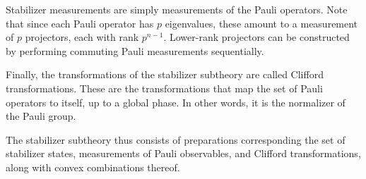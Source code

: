 \documentclass[%
 reprint,
superscriptaddress,
nofootinbib,
 amsmath,amssymb,
 prx, 
 accepted=2019-09-27,
]{quantumarticle}
\begin{document}
Stabilizer measurements are simply measurements of the Pauli
operators. Note that since each Pauli operator has $p$ eigenvalues,
these amount to a measurement of $p$ projectors, each with rank
$p^{n-1}$. Lower-rank projectors can be constructed by performing
commuting Pauli measurements sequentially.

Finally, the transformations of the stabilizer subtheory are called
Clifford transformations. These are the transformations that map the
set of Pauli operators to itself, up to a global phase. In other
words, it is the normalizer of the Pauli group.

The stabilizer subtheory thus consists of preparations corresponding
the set of stabilizer states, measurements of Pauli observables, and
Clifford transformations, along with convex combinations thereof.
\end{document}

